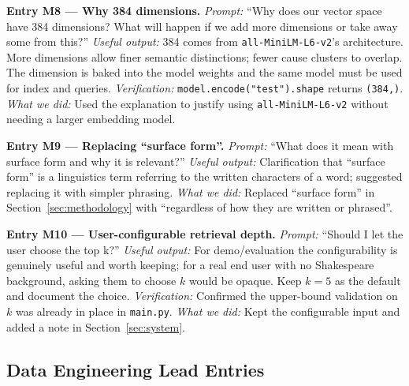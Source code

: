 \documentclass[10pt,conference]{IEEEtran}
\begin{document}
\textbf{Entry M8 --- Why 384 dimensions.}
\textit{Prompt:} ``Why does our vector space have 384 dimensions?
What will happen if we add more dimensions or take away some from
this?''
\textit{Useful output:} 384 comes from \texttt{all-MiniLM-L6-v2}'s
architecture. More dimensions allow finer semantic distinctions;
fewer cause clusters to overlap. The dimension is baked into the
model weights and the same model must be used for index and
queries.
\textit{Verification:} \texttt{model.encode("test").shape} returns
\texttt{(384,)}.
\textit{What we did:} Used the explanation to justify using
\texttt{all-MiniLM-L6-v2} without needing a larger embedding model.

\textbf{Entry M9 --- Replacing ``surface form''.}
\textit{Prompt:} ``What does it mean with surface form and why it
is relevant?''
\textit{Useful output:} Clarification that ``surface form'' is a
linguistics term referring to the written characters of a word;
suggested replacing it with simpler phrasing.
\textit{What we did:} Replaced ``surface form'' in
Section~\ref{sec:methodology} with ``regardless of how they are
written or phrased''.

\textbf{Entry M10 --- User-configurable retrieval depth.}
\textit{Prompt:} ``Should I let the user choose the top k?''
\textit{Useful output:} For demo/evaluation the configurability is
genuinely useful and worth keeping; for a real end user with no
Shakespeare background, asking them to choose $k$ would be opaque.
Keep $k=5$ as the default and document the choice.
\textit{Verification:} Confirmed the upper-bound validation on $k$
was already in place in \texttt{main.py}.
\textit{What we did:} Kept the configurable input and added a note
in Section~\ref{sec:system}.

\subsection*{Data Engineering Lead Entries}
\end{document}
